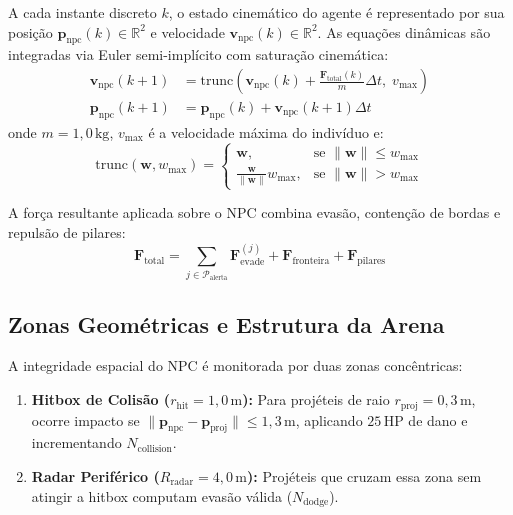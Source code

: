 \documentclass[10pt,conference,twocolumn]{article}
\begin{document}
A cada instante discreto $k$, o estado cinemático do agente é representado por sua posição $\mathbf{p}_{\text{npc}}(k) \in \mathbb{R}^2$ e velocidade $\mathbf{v}_{\text{npc}}(k) \in \mathbb{R}^2$. As equações dinâmicas são integradas via Euler semi-implícito com saturação cinemática:
\begin{align}
\mathbf{v}_{\text{npc}}(k+1) &= \text{trunc}\left(\mathbf{v}_{\text{npc}}(k) + \frac{\mathbf{F}_{\text{total}}(k)}{m}\Delta t, \; v_{\text{max}}\right) \label{eq:euler_vel} \\
\mathbf{p}_{\text{npc}}(k+1) &= \mathbf{p}_{\text{npc}}(k) + \mathbf{v}_{\text{npc}}(k+1)\Delta t \label{eq:euler_pos}
\end{align}
onde $m = 1{,}0\,\text{kg}$, $v_{\text{max}}$ é a velocidade máxima do indivíduo e:
\begin{equation}
\text{trunc}(\mathbf{w}, w_{\text{max}}) = 
\begin{cases} 
\mathbf{w}, & \text{se } \|\mathbf{w}\| \le w_{\text{max}} \\ 
\frac{\mathbf{w}}{\|\mathbf{w}\|} w_{\text{max}}, & \text{se } \|\mathbf{w}\| > w_{\text{max}} 
\end{cases}
\end{equation}

A força resultante aplicada sobre o NPC combina evasão, contenção de bordas e repulsão de pilares:
\begin{equation}
\mathbf{F}_{\text{total}} = \sum_{j \in \mathcal{P}_{\text{alerta}}} \mathbf{F}_{\text{evade}}^{(j)} + \mathbf{F}_{\text{fronteira}} + \mathbf{F}_{\text{pilares}}
\end{equation}

\subsection{Zonas Geométricas e Estrutura da Arena}
A integridade espacial do NPC é monitorada por duas zonas concêntricas:
\begin{enumerate}
    \item \textbf{Hitbox de Colisão ($r_{\text{hit}} = 1{,}0\,\text{m}$):} Para projéteis de raio $r_{\text{proj}} = 0{,}3\,\text{m}$, ocorre impacto se $\|\mathbf{p}_{\text{npc}} - \mathbf{p}_{\text{proj}}\| \le 1{,}3\,\text{m}$, aplicando $25\,\text{HP}$ de dano e incrementando $N_{\text{collision}}$.
    \item \textbf{Radar Periférico ($R_{\text{radar}} = 4{,}0\,\text{m}$):} Projéteis que cruzam essa zona sem atingir a hitbox computam evasão válida ($N_{\text{dodge}}$).
\end{enumerate}
\end{document}
